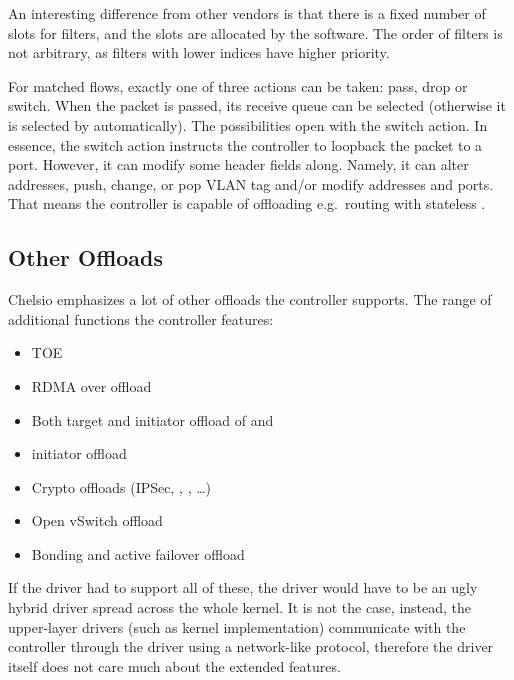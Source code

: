 An interesting difference from other vendors is that there is a fixed number of
slots for filters, and the slots are allocated by the software. The order of
filters is not arbitrary, as filters with lower indices have higher priority.

For matched flows, exactly one of three actions can be taken: pass, drop or
switch. When the packet is passed, its receive queue can be selected (otherwise
it is selected by  automatically). The possibilities open with the switch
action.  In essence, the switch action instructs the controller to loopback
the packet to a port. However, it can modify some header fields along. Namely,
it can alter  addresses, push, change, or pop VLAN tag and/or modify 
addresses and  ports. That means the controller is capable of offloading
e.g.\ routing with stateless .

\subsection{Other Offloads}

Chelsio emphasizes a lot of other offloads the controller supports. The range
of additional functions the controller features:

\begin{itemize}
\item {}\acrfull{TOE} %
\item \acrfull{RDMA} over  offload
\item Both target and initiator offload of  and 
\item {} initiator offload
\item Crypto offloads (IPSec, , , \dots)
\item Open vSwitch offload
\item Bonding and active failover offload
\end{itemize}

If the  driver had to support all of these, the driver would have to be
an ugly hybrid driver spread across the whole kernel. It is not the case,
instead, the upper-layer drivers (such as  kernel implementation)
communicate with the controller through the  driver using a network-like
protocol, therefore the  driver itself does not care much about the
extended features.
